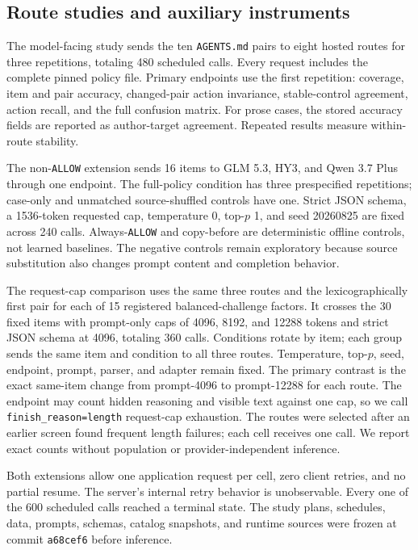 \documentclass[10pt]{article}
\newcommand{\allow}{\texttt{ALLOW}}
\begin{document}
\subsection{Route studies and auxiliary instruments}

The model-facing study sends the ten \texttt{AGENTS.md} pairs to eight hosted routes for three
repetitions, totaling 480 scheduled calls. Every request includes the complete pinned policy file.
Primary endpoints use the first repetition: coverage, item and pair accuracy, changed-pair action
invariance, stable-control agreement, action recall, and the full confusion matrix. For prose cases,
the stored accuracy fields are reported as author-target agreement. Repeated results
measure within-route stability.

The non-\allow{} extension sends 16 items to GLM 5.3, HY3, and Qwen 3.7 Plus through one endpoint.
The full-policy condition has three prespecified repetitions; case-only and unmatched
source-shuffled controls have one. Strict JSON schema, a 1536-token requested cap, temperature 0,
top-$p$ 1, and seed 20260825 are fixed across 240 calls. Always-\allow{} and copy-before are
deterministic offline controls, not learned baselines. The negative controls remain exploratory
because source substitution also changes prompt content and completion behavior.

The request-cap comparison uses the same three routes and the lexicographically first pair
for each of 15 registered balanced-challenge factors. It crosses the 30 fixed items with prompt-only
caps of 4096, 8192, and 12288 tokens and strict JSON schema at 4096, totaling 360 calls. Conditions
rotate by item; each group sends the same item and condition to all three routes. Temperature,
top-$p$, seed, endpoint, prompt, parser, and adapter remain fixed. The primary contrast is the exact
same-item change from prompt-4096 to prompt-12288 for each route. The endpoint may count hidden
reasoning and visible text against one cap, so we call \texttt{finish\_reason=length} request-cap
exhaustion. The routes were selected after an earlier screen found frequent length failures; each
cell receives one call. We report exact counts without population or provider-independent inference.

Both extensions allow one application request per cell, zero client retries, and no partial resume.
The server's internal retry behavior is unobservable. Every one of the 600 scheduled calls reached a
terminal state. The study plans, schedules, data, prompts, schemas, catalog snapshots, and runtime
sources were frozen at commit \texttt{a68cef6} before inference.
\end{document}
